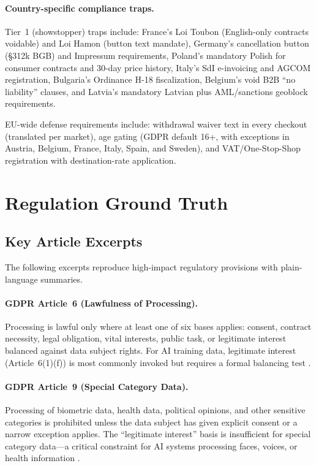 \documentclass[11pt,a4paper]{article}
\begin{document}
\paragraph{Country-specific compliance traps.}
Tier~1 (showstopper) traps include: France's Loi Toubon (English-only contracts voidable) and Loi Hamon (button text mandate), Germany's cancellation button (\S312k BGB) and Impressum requirements, Poland's mandatory Polish for consumer contracts and 30-day price history, Italy's SdI e-invoicing and AGCOM registration, Bulgaria's Ordinance H-18 fiscalization, Belgium's void B2B ``no liability'' clauses, and Latvia's mandatory Latvian plus AML/sanctions geoblock requirements.

EU-wide defense requirements include: withdrawal waiver text in every checkout (translated per market), age gating (GDPR default 16+, with exceptions in Austria, Belgium, France, Italy, Spain, and Sweden), and VAT/One-Stop-Shop registration with destination-rate application.


\section{Regulation Ground Truth}
\label{sec:ground-truth}

\subsection{Key Article Excerpts}

The following excerpts reproduce high-impact regulatory provisions with plain-language summaries.

\paragraph{GDPR Article~6 (Lawfulness of Processing).}
Processing is lawful only where at least one of six bases applies: consent, contract necessity, legal obligation, vital interests, public task, or legitimate interest balanced against data subject rights. For AI training data, legitimate interest (Article~6(1)(f)) is most commonly invoked but requires a formal balancing test \cite{gdpr}.

\paragraph{GDPR Article~9 (Special Category Data).}
Processing of biometric data, health data, political opinions, and other sensitive categories is prohibited unless the data subject has given explicit consent or a narrow exception applies. The ``legitimate interest'' basis is insufficient for special category data---a critical constraint for AI systems processing faces, voices, or health information \cite{gdpr}.
\end{document}
